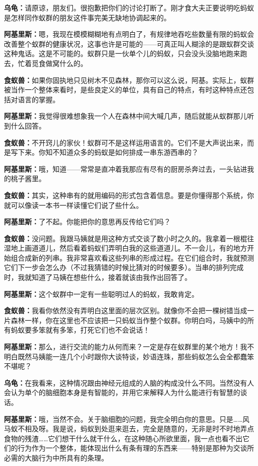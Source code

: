 \documentclass[
  12pt,
  twoside,
  openright,
  oldfontcommands,
]{memoir}
\newcommand{\dialogname}[1]{{\heifamily\bfseries #1}}
\begin{document}
\dialogname{乌龟：}请原谅，朋友们。很抱歉把你们的讨论打断了。刚才食大夫正要说明吃蚂蚁是怎样同作蚁群的朋友这件事完美无缺地协调起来的。

\dialogname{阿基里斯：}嗯，我现在模模糊糊地有点明白了，有规律地吞吃些数量有限的蚂蚁会改善整个蚁群的健康状况，这事也许是可能的------可真正叫人糊涂的是跟蚁群交谈这种鬼话。这是不可能的。蚁群只是一伙单个儿的蚂蚁，只会没头没脑地跑来跑去，忙着觅食做窝什么的。

\dialogname{食蚁兽：}如果你固执地只见树木不见森林，那你可以这么说，阿基。实际上，蚁群被当作一个整体来看时，是些良定义的单位，具有自己的特点，有时这种特点还包括对语言的掌握。

\dialogname{阿基里斯：}我觉得很难想象我一个人在森林中间大喊几声，随后就能从蚁群那儿听到什么回答。

\dialogname{食蚁兽：}不开窍儿的家伙！蚁群可不是这样运用语言的。它们不是大声说出来，而是写下来。你知不知道众多的蚂蚁是如何排成一串东游西串的？

\dialogname{阿基里斯：}哦，知道------常常是直冲着我那应有尽有的厨房杀奔过去，一头钻进我的桃子酱里。

\dialogname{食蚁兽：}其实，这种串有的就用编码的形式包含着信息。要是你懂得那个系统，你就可以像读一本书一样读懂它们说了些什么。

\dialogname{阿基里斯：}了不起。你能把你的意思再反传给它们吗？

\dialogname{食蚁兽：}没问题。我跟马姨就是用这种方式交谈了数小时之久的。我拿着一根棍往湿地上画道道儿，然后看着蚂蚁们弄明白我的这些道道儿。不一会儿，有的地方开始组合成新的列串。我非常喜欢看这些列串的形成过程。在它们组合时，我就预测它们下一步会怎么办（不过我猜错的时候比猜对的时候要多）。当串的排列完成时，我就知道了马姨在想些什么，接着就该由我作出回答了。

\dialogname{阿基里斯：}这个蚁群中一定有一些聪明过人的蚂蚁，我敢肯定。

\dialogname{食蚁兽：}我看你依然没有弄明白这里面的层次区别。就像你不会把一棵树错当成一片森林一样，你在这里也不应该把一只蚂蚁当作整个蚁群。你明白吗，马姨中的所有蚂蚁要多笨就有多笨，打死它们也不会说话！

\dialogname{阿基里斯：}那么，进行交流的能力从何而来？一定是存在蚁群里的某个地方！我不明白既然马姨能一连几个小时跟你大谈特谈，妙语连珠，那些蚂蚁怎么会全都蠢笨不堪呢？

\dialogname{乌龟：}在我看来，这种情况跟由神经元组成的人脑的构成没什么不同。当然没有人会认为单个的脑细胞本身是有智能的，并用它来解释人为什么能进行有智慧的谈话。

\dialogname{阿基里斯：}哦，当然不会。关于脑细胞的问题，我完全明白你的意思。只是\ldots\ldots 风马蚁不相及呀。我是说，蚂蚁到处逛来逛去，完全是随意的，无非是时不时地弄点食物的残渣\ldots\ldots 它们想干什么就干什么，在这种随心所欲里面，我一点也看不出它们的行为作为一个整体，能体现出什么有条有理的东西来------特别是那种为交谈所必需的大脑行为中所具有的条理。
\end{document}
